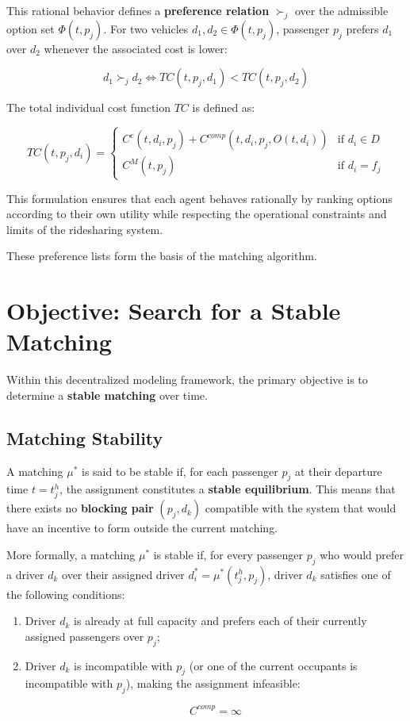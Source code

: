 \documentclass[11pt,a4paper]{article}
\begin{document}
This rational behavior defines a \textbf{preference relation} $\succ_j$ over the admissible option set $\Phi(t,p_j)$. For two vehicles $d_1,d_2\in\Phi(t,p_j)$, passenger $p_j$ prefers $d_1$ over $d_2$ whenever the associated cost is lower:

$$
d_1\succ_j d_2
\iff
TC(t,p_j,d_1)<TC(t,p_j,d_2)
$$

The total individual cost function $TC$ is defined as:

$$
TC(t,p_j,d_i)=
\begin{cases}
C^c(t,d_i,p_j)
+
C^{comp}(t,d_i,p_j,O(t,d_i))
&
\text{if }d_i\in D
\\
C^M(t,p_j)
&
\text{if }d_i=f_j
\end{cases}
$$

This formulation ensures that each agent behaves rationally by ranking options according to their own utility while respecting the operational constraints and limits of the ridesharing system.

These preference lists form the basis of the matching algorithm.


\section{Objective: Search for a Stable Matching}

Within this decentralized modeling framework, the primary objective is to determine a \textbf{stable matching} over time.

\subsection{Matching Stability}

A matching $\mu^*$ is said to be stable if, for each passenger $p_j$ at their departure time $t=t_j^h$, the assignment constitutes a \textbf{stable equilibrium}. This means that there exists no \textbf{blocking pair} $(p_j,d_k)$ compatible with the system that would have an incentive to form outside the current matching.

More formally, a matching $\mu^*$ is stable if, for every passenger $p_j$ who would prefer a driver $d_k$ over their assigned driver $d_i^*=\mu^*(t_j^h,p_j)$, driver $d_k$ satisfies one of the following conditions:

\begin{enumerate}

    \item Driver $d_k$ is already at full capacity and prefers each of their currently assigned passengers over $p_j$;

    \item Driver $d_k$ is incompatible with $p_j$ (or one of the current occupants is incompatible with $p_j$), making the assignment infeasible:

$$
C^{comp}=\infty
$$

\end{enumerate}
\end{document}
